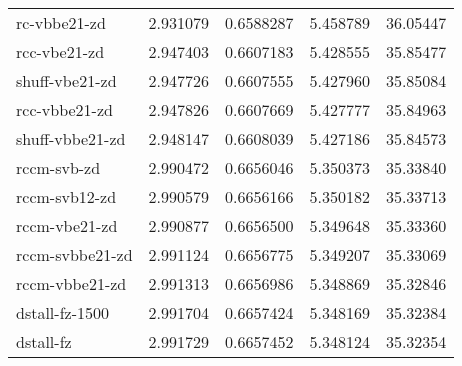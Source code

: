\begin{table}
\begin{tabular}{|l|l|l|l|l|}
        rc-vbbe21-zd   & 2.931079  &  0.6588287 & 5.458789 & 36.05447\\
        rcc-vbe21-zd   & 2.947403  &  0.6607183 & 5.428555 & 35.85477\\
   shuff-vbe21-zd   & 2.947726  &  0.6607555 & 5.427960 & 35.85084\\
       rcc-vbbe21-zd   & 2.947826  &  0.6607669 & 5.427777 & 35.84963\\
  shuff-vbbe21-zd   & 2.948147  &  0.6608039 & 5.427186 & 35.84573\\
         rccm-svb-zd   & 2.990472  &  0.6656046 & 5.350373 & 35.33840\\
       rccm-svb12-zd   & 2.990579  &  0.6656166 & 5.350182 & 35.33713\\
       rccm-vbe21-zd   & 2.990877  &  0.6656500 & 5.349648 & 35.33360\\
     rccm-svbbe21-zd   & 2.991124  &  0.6656775 & 5.349207 & 35.33069\\
      rccm-vbbe21-zd   & 2.991313  &  0.6656986 & 5.348869 & 35.32846\\
      dstall-fz-1500   & 2.991704  &  0.6657424 & 5.348169 & 35.32384\\
           dstall-fz   & 2.991729  &  0.6657452 & 5.348124 & 35.32354\\

\end{tabular}
\end{table}
